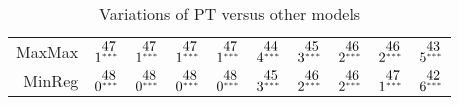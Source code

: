 \documentclass[a4paper]{article}\usepackage[]{graphicx}\usepackage[]{color}
\begin{document}
\begin{table}[!htb]
\begin{tabular}{rlllllllll}
  MaxMax & $1^{\stackrel{\textstyle47\hfill}{\scriptscriptstyle***\hfill}}$ & $1^{\stackrel{\textstyle47\hfill}{\scriptscriptstyle***\hfill}}$ & $1^{\stackrel{\textstyle47\hfill}{\scriptscriptstyle***\hfill}}$ & $1^{\stackrel{\textstyle47\hfill}{\scriptscriptstyle***\hfill}}$ & $4^{\stackrel{\textstyle44\hfill}{\scriptscriptstyle***\hfill}}$ & $3^{\stackrel{\textstyle45\hfill}{\scriptscriptstyle***\hfill}}$ & $2^{\stackrel{\textstyle46\hfill}{\scriptscriptstyle***\hfill}}$ & $2^{\stackrel{\textstyle46\hfill}{\scriptscriptstyle***\hfill}}$ & $5^{\stackrel{\textstyle43\hfill}{\scriptscriptstyle***\hfill}}$ \\ 
  MinReg & $0^{\stackrel{\textstyle48\hfill}{\scriptscriptstyle***\hfill}}$ & $0^{\stackrel{\textstyle48\hfill}{\scriptscriptstyle***\hfill}}$ & $0^{\stackrel{\textstyle48\hfill}{\scriptscriptstyle***\hfill}}$ & $0^{\stackrel{\textstyle48\hfill}{\scriptscriptstyle***\hfill}}$ & $3^{\stackrel{\textstyle45\hfill}{\scriptscriptstyle***\hfill}}$ & $2^{\stackrel{\textstyle46\hfill}{\scriptscriptstyle***\hfill}}$ & $2^{\stackrel{\textstyle46\hfill}{\scriptscriptstyle***\hfill}}$ & $1^{\stackrel{\textstyle47\hfill}{\scriptscriptstyle***\hfill}}$ & $6^{\stackrel{\textstyle42\hfill}{\scriptscriptstyle***\hfill}}$ \\ 
   \hline
\end{tabular}
\caption{Variations of PT versus other models} 
\label{table6_PT_variations_vs_other_models}
\end{table}
\end{document}
